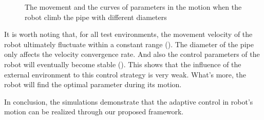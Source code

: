 \begin{figure}[!t]
	\centering
	
	\caption{The movement and the curves of parameters in the motion when the robot climb the pipe with different diameters}
\end{figure}

It is worth noting that, for all test environments, the movement velocity of the robot ultimately fluctuate within a constant range  (). The diameter of the pipe only affects the velocity convergence rate. And also the control parameters of the robot will eventually become stable (). This shows that the influence of the external environment to this control strategy is very weak. What's more, the robot will find the optimal parameter during its motion.

In conclusion, the simulations demonstrate that the adaptive control in robot's motion can be realized through our proposed framework.
